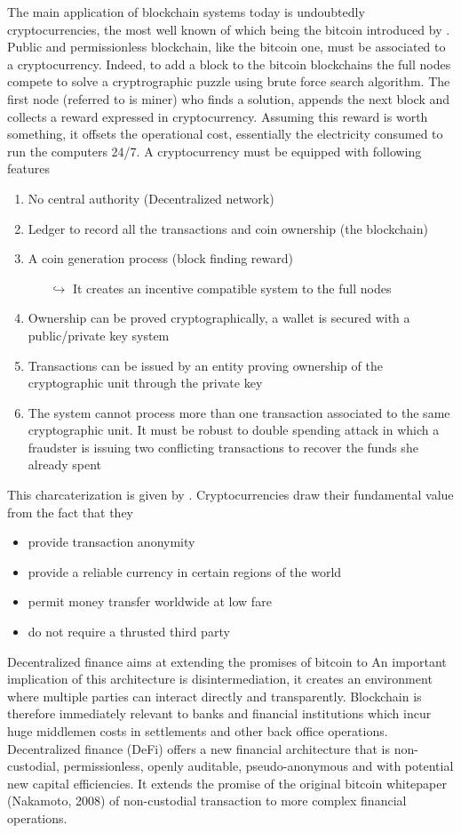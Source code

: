 \noindent The main application of blockchain systems today is undoubtedly cryptocurrencies, the most well known of which being the bitcoin introduced by \citet{Na08}. Public and permissionless blockchain, like the bitcoin one, must be associated to a cryptocurrency. Indeed, to add a block to the bitcoin blockchains the full nodes compete to solve a cryptrographic puzzle using brute force search algorithm. The first node (referred to is miner) who finds a solution, appends the next block and collects a reward expressed in cryptocurrency. Assuming this reward is worth something, it offsets the operational cost, essentially the electricity consumed to run the computers 24/7. A cryptocurrency must be equipped with following features
\begin{enumerate}
  \item No central authority (Decentralized network)
  \item Ledger to record all the transactions and coin ownership (the blockchain)
  \item A coin generation process (block finding reward)
    \begin{itemize}
    \item[$\hookrightarrow$] It creates an incentive compatible system to the full nodes 
  \end{itemize}
  \item Ownership can be proved cryptographically, a wallet is secured with a public/private key system 
  \item Transactions can be issued by an entity proving ownership of the cryptographic unit through the private key
  \item The system cannot process more than one transaction associated to the same cryptographic unit. It must be robust to double spending attack in which a fraudster is issuing two conflicting transactions to recover the funds she already spent
\end{enumerate}
This charcaterization is given by \citet{Lansky2018}.
Cryptocurrencies draw their fundamental value from the fact that they 
\begin{itemize}
  \item provide transaction anonymity
  \item provide a reliable currency in certain regions of the world
  \item permit money transfer worldwide at low fare
  \item do not require a thrusted third party
\end{itemize} 
Decentralized finance aims at extending the promises of bitcoin to An
important implication of this architecture is disintermediation, it creates an environment where
multiple parties can interact directly and transparently. Blockchain is therefore immediately relevant
to banks and financial institutions which incur huge middlemen costs in settlements and other back
office operations. Decentralized finance (DeFi) offers a new financial architecture that is non-custodial,
permissionless, openly auditable, pseudo-anonymous and with potential new capital efficiencies. It
extends the promise of the original bitcoin whitepaper (Nakamoto, 2008) of non-custodial transaction
to more complex financial operations.



